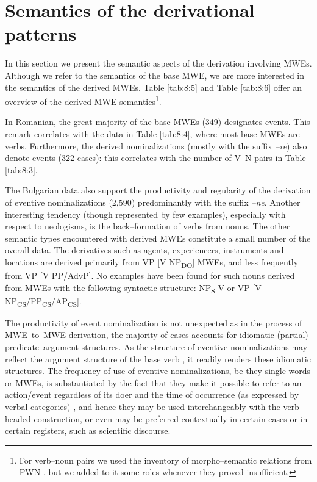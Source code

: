 \documentclass[output=paper]{langsci/langscibook}
\begin{document}
\section{Semantics of the derivational patterns}
\label{section7}

In this section we present the semantic aspects of the derivation
involving MWEs. Although we refer to the semantics of the base MWE, we
are more interested in the semantics of the derived MWEs. Table \ref{tab:8:5} and Table \ref{tab:8:6}
offer an overview of the derived MWE semantics\footnote{
For verb–noun pairs we used the inventory of
morpho–semantic relations from PWN \citep{fellbaum2009}, but we added
to it some roles whenever they proved insufficient.}. 

In Romanian, the great majority of the base MWEs (349) designates
events. This remark correlates with the data in Table \ref{tab:8:4}, where most
base MWEs are verbs. Furthermore, the derived nominalizations (mostly
with the suffix \textit{–re}) also denote events (322 cases): this correlates
with the number of V–N pairs in Table \nolinebreak \ref{tab:8:3}.



The Bulgarian data also support the productivity and regularity of the
derivation of eventive nominalizations (2,590) predominantly with the
suffix \textit{–ne}. Another interesting tendency (though represented by few
examples), especially with respect to neologisms, is the back–formation
of verbs from nouns. The other semantic types encountered with derived
MWEs constitute a small number of the overall data. The derivatives
such as agents, experiencers, instruments and locations are derived
primarily from VP [V NP\textsubscript{DO}] MWEs, and less frequently
from VP [V PP/AdvP]. No examples have been found for such nouns derived
from MWEs with the following syntactic structure: NP\textsubscript{S }V
or VP [V
NP\textsubscript{CS}/PP\textsubscript{CS}/AP\textsubscript{CS}].


The productivity of event nominalization is not unexpected as in the
process of MWE–to–MWE derivation, the majority of cases accounts for
idiomatic (partial) predicate–argument structures. As the structure of
eventive nominalizations may reflect the argument structure of the base
verb \citep{grimshaw1990}, it readily renders these idiomatic structures. The frequency of use of eventive nominalizations, be they single words
or MWEs, is substantiated by the fact that they make it possible to
refer to an action/event regardless of its doer and the time of
occurrence (as expressed by verbal categories) \citep{pometkova2006}, and
hence they may be used interchangeably with the verb–headed
construction, or even may be preferred contextually in certain cases or
in certain registers, such as scientific discourse.
\end{document}

